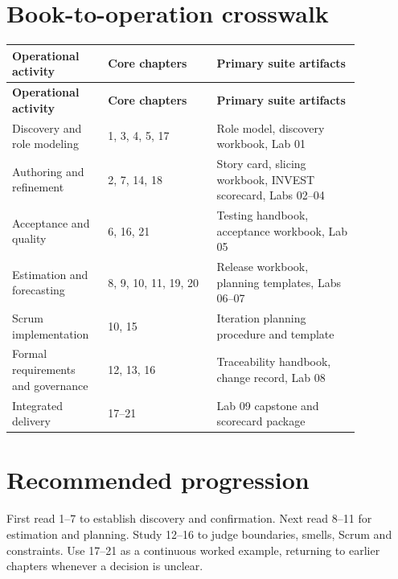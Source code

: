 \documentclass[11pt,letterpaper]{article}
\begin{document}
\section{Book-to-operation crosswalk}
\begin{longtable}{|p{0.20\linewidth}|p{0.29\linewidth}|p{0.37\linewidth}|}\hline
\textbf{Operational activity} & \textbf{Core chapters} & \textbf{Primary suite artifacts} \\ \hline\endfirsthead\hline
\textbf{Operational activity} & \textbf{Core chapters} & \textbf{Primary suite artifacts} \\ \hline\endhead
Discovery and role modeling & 1, 3, 4, 5, 17 & Role model, discovery workbook, Lab 01 \\ \hline
Authoring and refinement & 2, 7, 14, 18 & Story card, slicing workbook, INVEST scorecard, Labs 02–04 \\ \hline
Acceptance and quality & 6, 16, 21 & Testing handbook, acceptance workbook, Lab 05 \\ \hline
Estimation and forecasting & 8, 9, 10, 11, 19, 20 & Release workbook, planning templates, Labs 06–07 \\ \hline
Scrum implementation & 10, 15 & Iteration planning procedure and template \\ \hline
Formal requirements and governance & 12, 13, 16 & Traceability handbook, change record, Lab 08 \\ \hline
Integrated delivery & 17–21 & Lab 09 capstone and scorecard package \\ \hline
\end{longtable}
\section{Recommended progression}
First read 1–7 to establish discovery and confirmation. Next read 8–11 for estimation and planning. Study 12–16 to judge boundaries, smells, Scrum and constraints. Use 17–21 as a continuous worked example, returning to earlier chapters whenever a decision is unclear.
\end{document}

